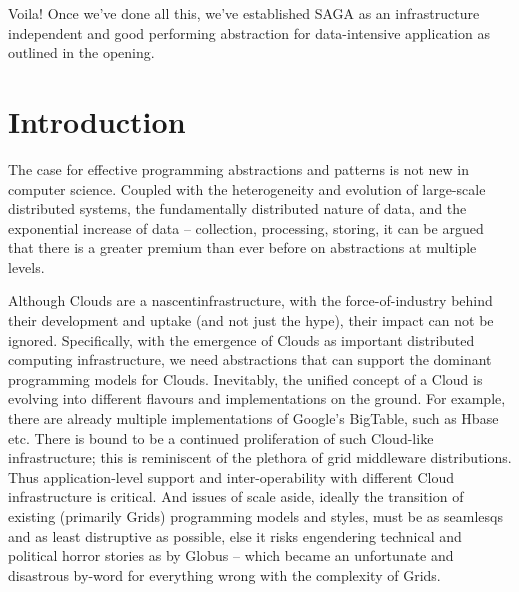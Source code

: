 \documentclass[conference,final]{IEEEtran}
\begin{document}
{Voila! Once we've done all this, we've established SAGA as an
infrastructure independent and good performing abstraction for
data-intensive application as outlined in the opening.}

\section{Introduction} 

The case for effective programming abstractions and patterns is not
new in computer science.  Coupled with the heterogeneity and evolution
of large-scale distributed systems, the fundamentally distributed
nature of data, and the exponential increase of data -- collection,
processing, storing, it can be argued that there is a greater premium
than ever before on abstractions at multiple levels.


Although Clouds are a nascentinfrastructure, with the
force-of-industry behind their development and uptake (and not just
the hype), their impact can not be ignored.  Specifically, with the
emergence of Clouds as important distributed computing infrastructure,
we need abstractions that can support the dominant programming models
for Clouds. Inevitably, the unified concept of a Cloud is evolving
into different flavours and implementations on the ground. For
example, there are already multiple implementations of Google's
BigTable, such as Hbase etc. There is bound to be a continued
proliferation of such Cloud-like infrastructure; this is reminiscent
of the plethora of grid middleware distributions. Thus
application-level support and inter-operability with different Cloud
infrastructure is critical. And issues of scale aside, ideally the
transition of existing (primarily Grids) programming models and
styles, must be as seamlesqs and as least distruptive as possible, else
it risks engendering technical and political horror stories as by
Globus -- which became an unfortunate and disastrous by-word for
everything wrong with the complexity of Grids.
\end{document}
